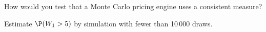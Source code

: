 \begin{interviewq}\label{iq:qm:girsanov-and-changes-of-numeraire:5}
How would you test that a Monte Carlo pricing engine uses a consistent measure?
\end{interviewq}

\begin{interviewq}\label{iq:qm:girsanov-and-changes-of-numeraire:6}
Estimate $\P(W_1 > 5)$ by simulation with fewer than 10\,000 draws.
\end{interviewq}
